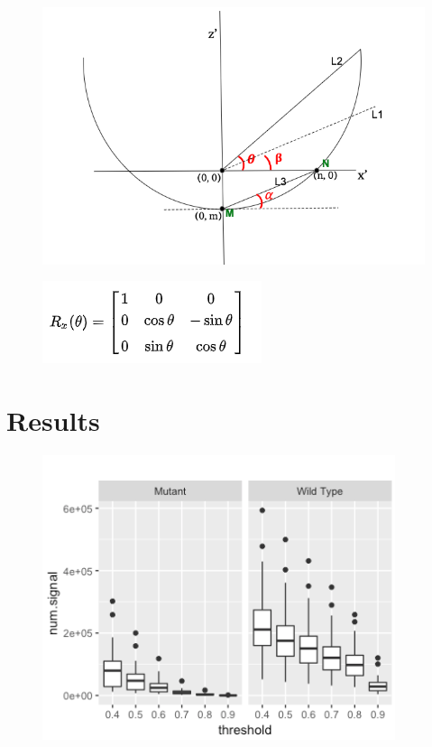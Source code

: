 \documentclass[10pt,letterpaper]{article}
\begin{document}
\begin{figure}[H]
\includegraphics[width=0.9\linewidth]{visualization_paper/rotation_angle} \end{figure}

\begin{figure}[H]
\includegraphics[width=0.5\linewidth]{visualization_paper/rotation_matrix} \end{figure}

\hypertarget{results}{%
\section{Results}\label{results}}

\begin{figure}[H]
\includegraphics[width=0.9\linewidth]{visualization_paper/thresh_numsig_boxplot} \end{figure}
\end{document}
